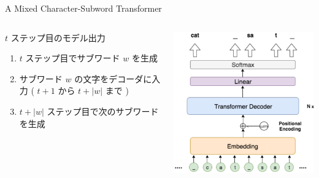 \documentclass[unicode, 12pt, xdvipdfmx, aspectratio=43]{beamer}
\begin{document}
\begin{frame}[label={sec:org8e01be5}]{A Mixed Character-Subword Transformer}
\begin{columns}
\begin{column}{0.65\columnwidth}
\begin{block}{\(t\) ステップ目のモデル出力}
\begin{enumerate}
\item \(t\) ステップ目でサブワード \(w\) を生成
\item サブワード \(w\) の文字をデコーダに入力 ( \(t+1\) から \(t+|w|\) まで )
\item \(t+|w|\) ステップ目で次のサブワードを生成
\end{enumerate}
\end{block}
\end{column}

\begin{column}{0.35\columnwidth}
\begin{center}
\includegraphics[width=1.1\linewidth]{./figure/Figure2.pdf}
\end{center}
\end{column}
\end{columns}
\end{frame}
\end{document}
